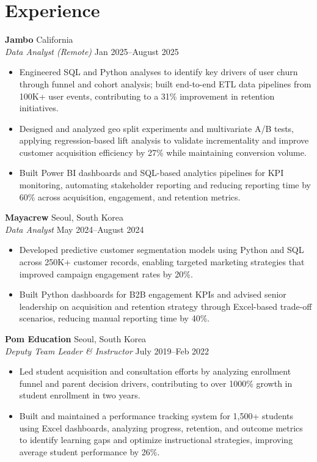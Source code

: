 \documentclass[11pt,a4paper]{article}
\begin{document}
\section*{Experience}  
\noindent
\textbf{Jambo} \hfill California   \\
\textit{Data Analyst (Remote)} \hfill Jan 2025--August 2025  
\begin{itemize}[leftmargin=*, noitemsep, topsep=0pt]
    \item Engineered SQL and Python analyses to identify key drivers of user churn through funnel and cohort analysis; built end-to-end ETL data pipelines from 100K+ user events, contributing to a 31\% improvement in retention initiatives.  
    \item Designed and analyzed geo split experiments and multivariate A/B tests, applying regression-based lift analysis to validate incrementality and improve customer acquisition efficiency by 27\% while maintaining conversion volume.  
    \item Built Power BI dashboards and SQL-based analytics pipelines for KPI monitoring, automating stakeholder reporting and reducing reporting time by 60\% across acquisition, engagement, and retention metrics.  
\end{itemize}
\vspace{6pt}

\noindent
\textbf{Mayacrew} \hfill Seoul, South Korea   \\
\textit{Data Analyst} \hfill May 2024--August 2024  
\begin{itemize}[leftmargin=*, noitemsep, topsep=0pt]
    \item Developed predictive customer segmentation models using Python and SQL across 250K+ customer records, enabling targeted marketing strategies that improved campaign engagement rates by 20\%.  
    \item Built Python dashboards for B2B engagement KPIs and advised senior leadership on acquisition and retention strategy through Excel-based trade-off scenarios, reducing manual reporting time by 40\%.  
\end{itemize}
\vspace{6pt}

\noindent
\textbf{Pom Education} \hfill Seoul, South Korea   \\
\textit{Deputy Team Leader \& Instructor} \hfill July 2019--Feb 2022  
\begin{itemize}[leftmargin=*, noitemsep, topsep=0pt]
    \item Led student acquisition and consultation efforts by analyzing enrollment funnel and parent decision drivers, contributing to over 1000\% growth in student enrollment in two years.  
    \item Built and maintained a performance tracking system for 1,500+ students using Excel dashboards, analyzing progress, retention, and outcome metrics to identify learning gaps and optimize instructional strategies, improving average student performance by 26\%.  
\end{itemize}
\end{document}
